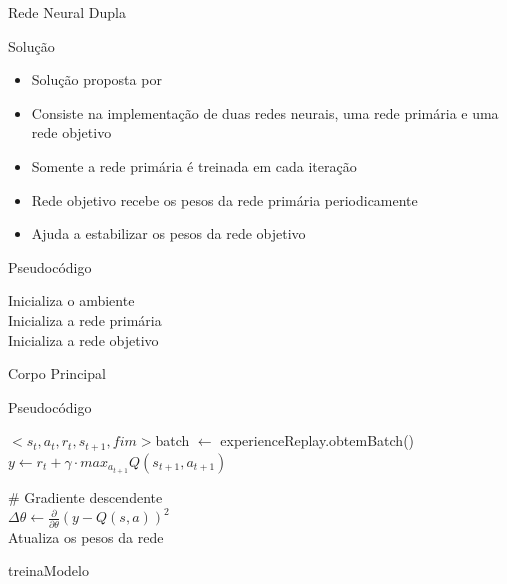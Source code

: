 \documentclass[aspectratio=169]{beamer}
\begin{document}
\begin{frame}{Rede Neural Dupla}
	\begin{block}{Solução}
		\begin{itemize}
			\item Solução proposta por \cite{vanhasselt2015deep}
			\item Consiste na implementação de duas redes neurais, uma rede primária e uma rede objetivo
			\item Somente a rede primária é treinada em cada iteração
			\item Rede objetivo recebe os pesos da rede primária periodicamente
			\item Ajuda a estabilizar os pesos da rede objetivo
		\end{itemize}
	\end{block}
\end{frame}

\begin{frame}{Pseudocódigo}
	\begin{algorithm}[H]
		\SetAlgoLined
		Inicializa o ambiente\\
		Inicializa a rede primária\\
		Inicializa a rede objetivo\\

	 \caption{Corpo Principal}
	\end{algorithm}
\end{frame}



\begin{frame}{Pseudocódigo}
	\begin{algorithm}[H]
		\SetAlgoLined
		$<s_t,a_t,r_t,s_{t+1},fim>$batch  $\leftarrow$ experienceReplay.obtemBatch()\\
		{
			$y \leftarrow r_t + \gamma\cdot max_{a_{t+1}}Q(s_{t+1},a_{t+1})$
		}

		\# Gradiente descendente\\
		$\Delta\theta\leftarrow\frac{\partial}{\partial\theta}(y - Q(s,a))^2$\\[.3cm]

		Atualiza os pesos da rede
	 \caption{treinaModelo}
	\end{algorithm}
\end{frame}
\end{document}
